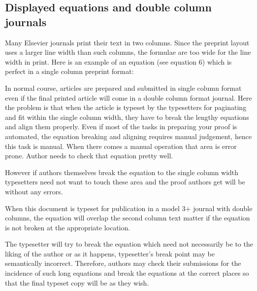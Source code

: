 \documentclass[a4paper,12pt]{article}
\begin{document}
\enlargethispage*{\baselineskip}

\subsection*{Displayed equations and double column journals}

Many Elsevier journals print their text in two columns. Since
the preprint layout uses a larger line width than such columns,
the formulae are too wide for the line width in print. Here is an
example of an equation  (see equation 6) which is perfect in a
single column preprint format:

In normal course, articles are prepared and submitted in single column
format even if the final printed article will come in a double column
format journal. Here the problem is that when the article is typeset by
the typesetters for paginating and fit within the single column width,
they have to break the lengthy equations and align them properly. Even
if most of the tasks in preparing your proof is automated, the equation
breaking and aligning requires manual judgement, hence this task is manual.
When there comes a manual operation that area is error prone. Author
needs to check that equation pretty well. 

However if authors themselves break the equation to the single column
width typesetters need not want to touch these area and the proof authors
get will be without any errors.

\setlength\Sep{6pt}
\def\rulecolor{blue!70}
\def\rulecolor{orange}
                 	
\noindent When this document is typeset for publication in a
model 3+ journal with double columns, the equation will overlap
the second column text matter if the equation is not broken at
the appropriate location.

\vspace*{6pt}
\def\rulecolor{blue!70}
\def\rulecolor{orange}
\vspace*{6pt}

\noindent The typesetter will try to break the equation which
need not necessarily be to the liking of the author or as it
happens, typesetter's break point may be semantically incorrect.
Therefore, authors may check their submissions for the incidence
of such long equations and break the equations at the correct
places so that the final typeset copy will be as they wish.
\end{document}
